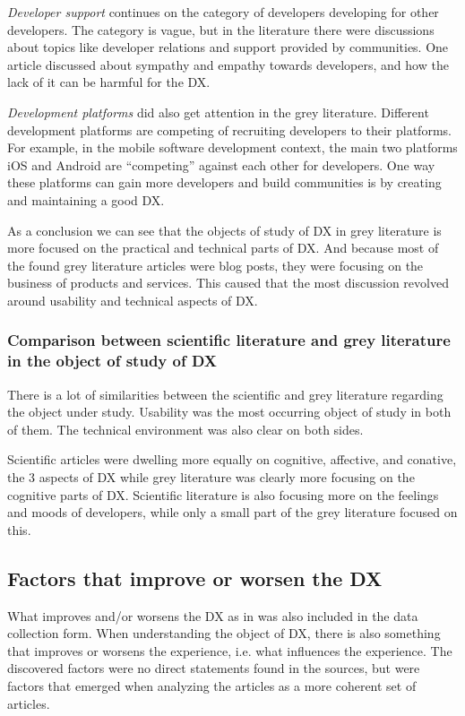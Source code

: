 \documentclass[english, 12pt, a4paper, sci, utf8, a-1b, online]{aaltothesis}
\begin{document}
\textit{Developer support} continues on the category of developers developing for other developers. The category is vague, but in the literature there were discussions about topics like developer relations and support provided by communities. One article discussed about sympathy and empathy towards developers, and how the lack of it can be harmful for the DX.

\textit{Development platforms} did also get attention in the grey literature. Different development platforms are competing of recruiting developers to their platforms. For example, in the mobile software development context, the main two platforms iOS and Android are ``competing'' against each other for developers. One way these platforms can gain more developers and build communities is by creating and maintaining a good DX.

As a conclusion we can see that the objects of study of DX in grey literature is more focused on the practical and technical parts of DX. And because most of the found grey literature articles were blog posts, they were focusing on the business of products and services. This caused that the most discussion revolved around usability and technical aspects of DX.

\subsubsection{Comparison between scientific literature and grey literature in the object of study of DX}

There is a lot of similarities between the scientific and grey literature regarding the object under study. Usability was the most occurring object of study in both of them. The technical environment was also clear on both sides.

Scientific articles were dwelling more equally on cognitive, affective, and conative, the 3 aspects of DX while grey literature was clearly more focusing on the cognitive parts of DX. Scientific literature is also focusing more on the feelings and moods of developers, while only a small part of the grey literature focused on this.

\subsection{Factors that improve or worsen the DX}

What improves and/or worsens the DX as in \textcite{fagerholm-doctoral-thesis} was also included in the data collection form. When understanding the object of DX, there is also something that improves or worsens the experience, i.e. what influences the experience. The discovered factors were no direct statements found in the sources, but were factors that emerged when analyzing the articles as a more coherent set of articles.
\end{document}
